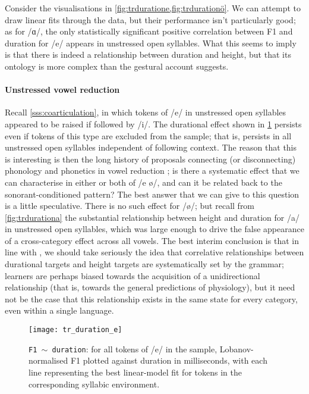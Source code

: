 Consider the visualisations in \cref{fig:trduratione,fig:trdurationö}. We can attempt to draw linear fits through the data, but their performance isn't particularly good; as for /ɑ/, the only statistically significant positive correlation between F1 and duration for /e/ appears in unstressed open syllables. What this seems to imply is that there is indeed a relationship between duration and height, but that its ontology is more complex than the gestural account suggests.

\paragraph{Unstressed vowel reduction} Recall \cref{sss:coarticulation}, in which tokens of /e/ in unstressed open syllables appeared to be raised if followed by /i/. The durational effect shown in \cref{fig:trduratione} persists even if tokens of this type are excluded from the sample; that is, persists in all unstressed open syllables independent of following context. The reason that this is interesting is then the long history of proposals connecting (or disconnecting) phonology and phonetics in vowel reduction \citep{Barnes2007,Iosad2012}; is there a systematic effect that we can characterise in either or both of /e ø/, and can it be related back to the sonorant-conditioned pattern? The best answer that we can give to this question is a little speculative. There is no such effect for /ø/; but recall from \cref{fig:trdurationa} the substantial relationship between height and duration for /a/ in unstressed open syllables, which was large enough to drive the false appearance of a cross-category effect across all vowels. The best interim conclusion is that in line with \citet{Tauberer2009,Sole2010,Toivonen2015}, we should take seriously the idea that correlative relationships between durational targets and height targets are systematically set by the grammar; learners are perhaps biased towards the acquisition of a unidirectional relationship (that is, towards the general predictions of physiology), but it need not be the case that this relationship exists in the same state for every category, even within a single language.

\begin{figure}[H]
  \centering
  \texttt{[image: tr\_duration\_e]}
  \caption[\texttt{F1 $\sim$ duration} correlation for /e/, split by environment.]{\texttt{F1 $\sim$ duration}: for all tokens of /e/ in the sample, Lobanov-normalised F1 plotted against duration in milliseconds, with each line representing the best linear-model fit for tokens in the corresponding syllabic environment.}
  \label{fig:trduratione}
\end{figure}

